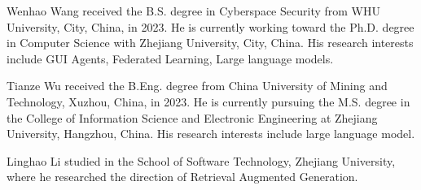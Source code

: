 \vspace{-3em}

\begin{IEEEbiography}{Wenhao Wang}
received the B.S. degree in Cyberspace Security from WHU University, City, China, in 2023. He is currently working toward the Ph.D. degree in Computer Science with Zhejiang University, City, China. His research interests include GUI Agents, Federated Learning, Large language models.
\end{IEEEbiography}

\vspace{-3em}

\begin{IEEEbiography}{Tianze Wu}
received the B.Eng. degree from China University of Mining and Technology, Xuzhou, China, in 2023. He is currently pursuing the M.S. degree in the College of Information Science and Electronic Engineering at Zhejiang University, Hangzhou, China. His research interests include large language model.
\end{IEEEbiography}

\vspace{-3em}

\begin{IEEEbiography}{Linghao Li}
studied in the School of Software Technology, Zhejiang University, where he researched the direction of Retrieval Augmented Generation.
\end{IEEEbiography}

